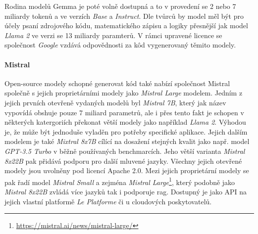 \documentclass[czech, ma, kiv, he, iso690numb, pdf, viewonly]{fasthesis}
\begin{document}
    Rodina modelů Gemma je poté volně dostupná a to v provedení se 2 nebo 7 miliardy tokenů a ve verzích \textit{Base} a \textit{Instruct}. Dle tvůrců by model měl být pro účely psaní zdrojového kódu, matematického zápisu a logiky přesnější jak model \textit{Llama 2} ve verzi se 13 miliardy paramterů. \cite{gemma_introduction} V rámci upravené licence se společnost \textit{Google} vzdává odpovědnosti za kôd vygenerovaný těmito modely.

    \paragraph{Mistral} Open-source modely schopné generovat kód také nabízí společnost Mistral společně s jejich proprietárními modely jako \textit{Mistral Large} modelem. Jedním z jejich prvních otevřeně vydaných modelů byl \textit{Mistral 7B}, který jak název vypovídá obshuje pouze 7 miliard parametrů, ale i přes tento fakt je schopen v některých katergoriích překonat větší modely jako například \textit{Llama 2}. \cite{jiang2023mistral} Výhodou je, že může být jednoduše vyladěn pro potřeby specifické aplikace. Jejich dalším modelem je také \textit{Mixtral 8x7B} cílící na dosažení stejných kvalit jako např. model \textit{GPT-3.5 Turbo} v běžně používaných benchmarcích. Jeho větší varianta \textit{Mistral 8x22B} pak přidává podporu pro další mluvené jazyky. \cite{jiang2024mixtral} Všechny jejich otevřené modely jsou uvolněny pod licencí Apache 2.0. Mezi jejich proprietární modely se pak řadí model \textit{Mistral Small} a zejména \textit{Mistral Large}\footnote{\url{https://mistral.ai/news/mistral-large/}}, který podobně jako \textit{Mistral 8x22B} zvládá více jazyků tak i podporuje \Gls{rag}. Dostupný je jako API na jejich vlastní platformě \textit{Le Platforme} či u cloudových poskytovatelů.

        \newpage
\end{document}
